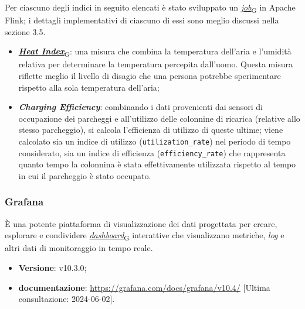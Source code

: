 Per ciascuno degli indici in seguito elencati è stato sviluppato un \href{https://7last.github.io/docs/pb/documentazione-interna/glossario\#job}{\textit{job}\textsubscript{G}} in Apache Flink; i dettagli implementativi di ciascuno di essi sono meglio discussi nella sezione 3.5. %
\begin{itemize}
	\item \href{https://7last.github.io/docs/pb/documentazione-interna/glossario\#heat-index}{\textbf{\textit{Heat Index}}\textsubscript{G}}: una misura che combina la temperatura dell'aria e l'umidità relativa per determinare la temperatura percepita dall'uomo. Questa misura riflette meglio il livello di disagio che una persona potrebbe sperimentare rispetto alla sola temperatura dell'aria;
	\item \textbf{\textit{Charging Efficiency}}: combinando i dati provenienti dai sensori di occupazione dei parcheggi e all'utilizzo delle colonnine di ricarica (relative
	      allo stesso parcheggio), si calcola l'efficienza di utilizzo di queste ultime; viene calcolato sia un indice di utilizzo (\texttt{utilization\_rate}) nel periodo
	      di tempo considerato, sia un indice di efficienza (\texttt{efficiency\_rate}) che rappresenta quanto tempo la colonnina è stata effettivamente utilizzata rispetto
	      al tempo in cui il parcheggio è stato occupato.
\end{itemize}

\subsubsection{Grafana}
È una potente piattaforma di visualizzazione dei dati progettata per creare, esplorare e condividere \href{https://7last.github.io/docs/pb/documentazione-interna/glossario\#dashboard}{\textit{dashboard}\textsubscript{G}}  interattive che visualizzano metriche, \textit{log} e altri dati di monitoraggio in tempo reale.

\begin{itemize}
	\item \textbf{Versione}: v10.3.0;
	\item \textbf{documentazione}: \url{https://grafana.com/docs/grafana/v10.4/} [Ultima consultazione: 2024-06-02].
\end{itemize}

